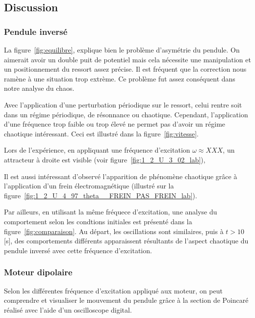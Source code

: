\documentclass[a4paper,12pt,oneside]{article}
\begin{document}
\subsection{Discussion}

\subsubsection{Pendule inversé}
La figure~\ref{fig:equilibre}, explique bien le problème d'asymétrie du pendule. On aimerait avoir un double puit de potentiel mais cela nécessite une manipulation et un positionnement du ressort assez précise. Il est fréquent que la correction nous ramène à une situation trop extrème. Ce problème fut assez conséquent dans notre analyse du chaos.

Avec l'application d'une perturbation périodique sur le ressort, celui rentre soit dans un régime périodique, de résonnance ou chaotique. Cependant, l'application d'une fréquence trop faible ou trop élevé ne permet pas d'avoir un régime chaotique intéressant. Ceci est illustré dans la figure~\ref{fig:vitesse}.

Lors de l'expérience, en appliquant une fréquence d'excitation $\omega \approx XXX$, un attracteur à droite est visible (voir figure~\ref{fig:1_2_U_3_02_lab}), %

Il est aussi intéressant d'observé l'apparition de phénomène chaotique grâce à l'application d'un frein électromagnétique (illustré sur la figure~\ref{fig:1_2_U_4_97_theta__FREIN_PAS_FREIN_lab}). %

Par ailleurs, en utilisant la même fréquece d'excitation, une analyse du comportement selon les condtions initiales est présenté dans la figure~\ref{fig:comparaison}. Au départ, les oscillations sont similaires, puis à $t>10$ [s], des comportements différents apparaissent résultants de l'aspect chaotique du pendule inversé avec cette fréquence d'excitation. 

\subsubsection{Moteur dipolaire}

Selon les différentes fréquence d'excitation appliqué aux moteur, on peut comprendre et visualiser le mouvement du pendule grâce à la section de Poincaré réalisé avec l'aide d'un oscilloscope digital.
\end{document}
